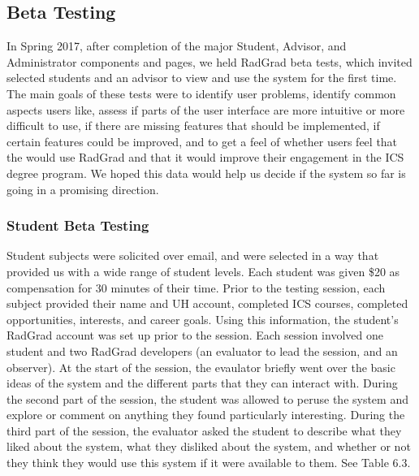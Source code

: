 \subsection{Beta Testing}
In Spring 2017, after completion of the major Student, Advisor, and Administrator components and pages, we held RadGrad beta tests, which invited selected students and an advisor to view and use the system for the first time. The main goals of these tests were to identify user problems, identify common aspects users like, assess if parts of the user interface are more intuitive or more difficult to use, if there are missing features that should be implemented, if certain features could be improved, and to get a feel of whether users feel that the would use RadGrad and that it would improve their engagement in the ICS degree program. We hoped this data would help us decide if the system so far is going in a promising direction.

\subsubsection{Student Beta Testing}
Student subjects were solicited over email, and were selected in a way that provided us with a wide range of student levels. Each student was given \$20 as compensation for 30 minutes of their time. Prior to the testing session, each subject provided their name and UH account, completed ICS courses, completed opportunities, interests, and career goals. Using this information, the student's RadGrad account was set up prior to the session. Each session involved one student and two RadGrad developers (an evaluator to lead the session, and an observer). At the start of the session, the evaulator briefly went over the basic ideas of the system and the different parts that they can interact with. During the second part of the session, the student was allowed to peruse the system and explore or comment on anything they found particularly interesting. During the third part of the session, the evaluator asked the student to describe what they liked about the system, what they disliked about the system, and whether or not they think they would use this system if it were available to them. See Table 6.3.

